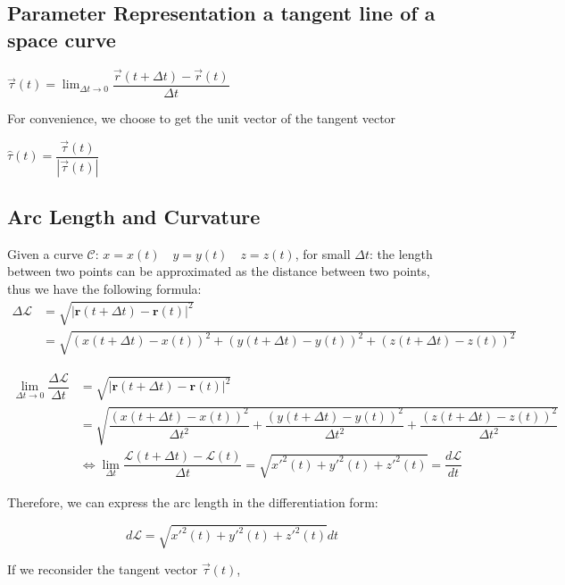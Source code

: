 \documentclass[UTF8,a4paper, 10pt, openany]{book}
\begin{document}
\subsection{Parameter Representation a tangent line of a space curve}
\begin{center}
$\overrightarrow{\tau}(t)=\displaystyle\lim_{\Delta t\to 0}\dfrac{\overrightarrow{r}(t+\Delta t)-\overrightarrow{r}(t)}{\Delta t} $
\end{center}
For convenience, we choose to get the unit vector of the tangent vector \\
\begin{center}
$\hat{\tau }(t)=\dfrac{\overrightarrow{\tau }(t)}{|\overrightarrow{\tau }(t)|}$
\end{center}

\subsection{Arc Length and Curvature}
Given a curve $\mathcal{C}$: $x=x(t)\quad y=y(t)\quad z=z(t)$, for small $\Delta t$: the length between two points can be approximated as the distance between two points, thus we have the following formula:
\begin{align*}
\Delta\mathcal{L} & = \sqrt{|\mathbf{r}(t+\Delta t)-\mathbf{r}(t)|^2}\\
& =\sqrt{(x(t+\Delta t)-x(t))^2+(y(t+\Delta t)-y(t))^2+(z(t+\Delta t)-z(t))^2}
\end{align*}

\begin{align*}
\lim_{\Delta t \to 0}\dfrac{\Delta\mathcal{L}}{\Delta t} &= \sqrt{|\mathbf{r}(t+\Delta t)-\mathbf{r}(t)|^2}	\\
&= \sqrt{\dfrac{(x(t+\Delta t)-x(t))^2}{\Delta t^2}+\dfrac{(y(t+\Delta t)-y(t))^2}{\Delta t^2}+\dfrac{(z(t+\Delta t)-z(t))^2}{\Delta t^2}}		\\
&\iff \displaystyle\lim_{\Delta t}\dfrac{\mathcal{L}(t+\Delta t)-\mathcal{L}(t)}{\Delta t}=\sqrt{x'^2(t)+y'^2(t)+z'^2(t)}=\dfrac{d\mathcal{L}}{dt}
\end{align*}

Therefore, we can express the arc length in the differentiation form:

\begin{equation}
\boxed{d\mathcal{L}=\sqrt{x'^2(t)+y'^2(t)+z'^2(t)}dt}
\end{equation}

If we reconsider the tangent vector $\overrightarrow{\tau }(t)$,
\end{document}
